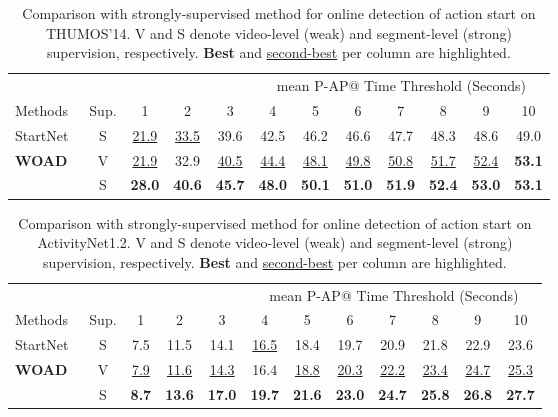 \documentclass[final]{cvpr}
\begin{document}
\begin{table*}[ht]
    \centering
\begin{tabular}{l|c||c|c|c|c|c|c|c|c|c|c}
        \multicolumn{12}{c}{\ \ \ \ \ \ \ \ \ \ \ \ \ \ \ \ \ \ \ \ \ \ \ \ \ \ \ \ \ \ \ \ \ \ \ mean P-AP@ Time Threshold (Seconds)} \\
        
        Methods & Sup. & 1 & 2 & 3 & 4 & 5 & 6 & 7 & 8 & 9 & 10 \\
        \midrule
        StartNet~\cite{gao2019startnet}& S
        &\underline{21.9} &\underline{33.5}  &39.6  &42.5  &46.2  &46.6  &47.7  &48.3  & 48.6 &49.0  \\
        \midrule
        \multirow{2}{*}{\textbf{WOAD}} & V& \underline{21.9} & 32.9 & \underline{40.5} & \underline{44.4} &\underline{48.1} & \underline{49.8} &\underline{50.8}&\underline{51.7} &\underline{52.4} & \textbf{53.1} \\
        \cmidrule{2-12}
        \cmidrule{2-12}
        & S & \textbf{28.0}&\textbf{40.6} &\textbf{45.7}&\textbf{48.0}&\textbf{50.1}&\textbf{51.0}&\textbf{51.9}&\textbf{52.4}&\textbf{53.0}&\textbf{53.1} \\
    \end{tabular}
\caption{Comparison with strongly-supervised method for online detection of action start on THUMOS'14. V and S denote video-level (weak) and segment-level (strong) supervision, respectively.  \textbf{Best} and \underline{second-best} per column are highlighted.}
    \label{tab: thumos_start}
\end{table*}
\begin{table*}[ht]
    \centering
\begin{tabular}{l|c||c|c|c|c|c|c|c|c|c|c}
        \multicolumn{12}{c}{\ \ \ \ \ \ \ \ \ \ \ \ \ \ \ \ \ \ \ \ \ \ \ \ \ \ \ \ \ \ \ \ \ \   mean P-AP@ Time Threshold (Seconds)} \\
        Methods & Sup. & 1 & 2 & 3 & 4 & 5 & 6 & 7 & 8 & 9 & 10 \\
        \midrule
        StartNet~\cite{gao2019startnet}&S &7.5 & 11.5 & 14.1 & \underline{16.5} & 18.4 &  19.7 &20.9 &21.8 & 22.9 & 23.6\\
        \midrule
        \multirow{2}{*}{\textbf{WOAD}} & V &\underline{7.9}&\underline{11.6}&\underline{14.3}&16.4&\underline{18.8}&\underline{20.3}&\underline{22.2}&\underline{23.4}&\underline{24.7}&\underline{25.3}  \\
        \cmidrule{2-12}
        \cmidrule{2-12}
        & S &\textbf{8.7}& \textbf{13.6}& \textbf{17.0}&\textbf{19.7}&\textbf{21.6}&\textbf{23.0}&\textbf{24.7}&\textbf{25.8}&\textbf{26.8}&\textbf{27.7}  \\
    \end{tabular}
\caption{Comparison with strongly-supervised method for online detection of action start on ActivityNet1.2. V and S denote video-level (weak) and segment-level (strong) supervision, respectively. \textbf{Best} and \underline{second-best} per column are highlighted.}
    \label{tab: anet_start}
\end{table*}
\end{document}
